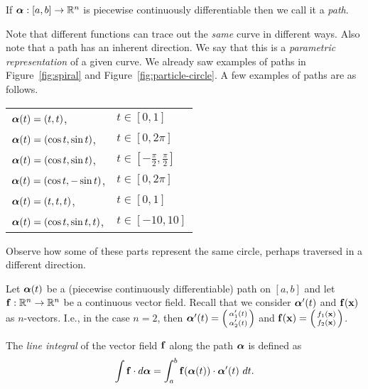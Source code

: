 \begin{definition}%
    \label{def:path}
    If \(\boldsymbol{\alpha}: [a,b] \to \mathbb{R}^n\) is piecewise continuously differentiable then we call it a \emph{path}.
\end{definition}

Note that different functions can trace out the \emph{same} curve in different ways.
Also note that a path has an inherent direction.
We say that this is a \emph{parametric representation} of a given curve.
We already saw examples of paths in Figure~\ref{fig:spiral} and Figure~\ref{fig:particle-circle}.
A few examples of paths are as follows.

\begin{center}
    \begin{tabular}{l l}
        \(\boldsymbol{\alpha}(t)= (t,t)\),              & \(t\in[0,1]\)                           \\
        \(\boldsymbol{\alpha}(t) = (\cos t, \sin t)\),  & \(t\in[0,2\pi]\)                        \\
        \(\boldsymbol{\alpha}(t) = (\cos t, \sin t)\),  & \(t\in [-\frac{\pi}{2},\frac{\pi}{2}]\) \\
        \(\boldsymbol{\alpha}(t) = (\cos t, -\sin t)\), & \(t\in[0,2\pi]\)                        \\
        \(\boldsymbol{\alpha}(t)= (t,t,t)\),            & \(t\in[0,1]\)                           \\
        \(\boldsymbol{\alpha}(t)=(\cos t, \sin t, t)\), & \(t\in [-10,10]\)
    \end{tabular}
\end{center}
\noindent
Observe how some of these parts represent the same circle, perhaps traversed in a different direction.

Let \(\boldsymbol{\alpha}(t)\) be a (piecewise continuously differentiable) path on \([a,b]\) and
let \(\mathbf{f}: \mathbb{R}^n\to\mathbb{R}^n\) be a continuous vector field.
Recall that we consider \(\boldsymbol{\alpha}'(t)\) and \(\mathbf{f}(\mathbf{x})\) as \(n\)-vectors.
I.e., in the case \(n=2\), then
\(\boldsymbol{\alpha}'(t) = \left(
\begin{smallmatrix}
        \alpha_1'(t) \\ \alpha_2'(t)
    \end{smallmatrix}
\right)\)
and \(\mathbf{f}(\mathbf{x}) = \left(
\begin{smallmatrix}
        f_1(\mathbf{x}) \\ f_2(\mathbf{x})
    \end{smallmatrix}
\right)\).

\begin{definition}%
    \label{def:line-integral}
    The \emph{line integral} of the vector field \(\mathbf{f}\) along the path \(\boldsymbol{\alpha}\) is defined as
    \[
        \int \mathbf{f} \cdot d\boldsymbol{\alpha} = \int_{a}^{b} \mathbf{f}(\boldsymbol{\alpha}(t)) \cdot \boldsymbol{\alpha}'(t) \ dt.
    \]
\end{definition}


